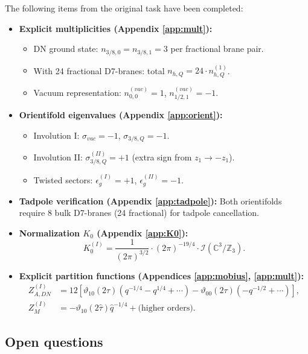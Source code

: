 \documentclass[11pt]{article}
\newcommand{\Z}{\mathbb{Z}}
\newcommand{\C}{\mathbb{C}}
\newcommand{\vt}{\vartheta}
\newcommand{\hq}{\hat{q}}
\newcommand{\htau}{\hat{\tau}}
\begin{document}
The following items from the original task have been completed:

\begin{itemize}
\item \textbf{Explicit multiplicities (Appendix \ref{app:mult}):}
\begin{itemize}
\item DN ground state: $n_{3/8, 0} = n_{3/8, 1} = 3$ per fractional brane pair.
\item With 24 fractional D7-branes: total $n_{h,Q} = 24 \cdot n^{(1)}_{h,Q}$.
\item Vacuum representation: $n^{(vac)}_{0,0} = 1$, $n^{(vac)}_{1/2,1} = -1$.
\end{itemize}

\item \textbf{Orientifold eigenvalues (Appendix \ref{app:orient}):}
\begin{itemize}
\item Involution I: $\sigma_{vac} = -1$, $\sigma_{3/8,Q} = -1$.
\item Involution II: $\sigma^{(II)}_{3/8,Q} = +1$ (extra sign from $z_1 \to -z_1$).
\item Twisted sectors: $\epsilon_g^{(I)} = +1$, $\epsilon_g^{(II)} = -1$.
\end{itemize}

\item \textbf{Tadpole verification (Appendix \ref{app:tadpole}):} Both orientifolds require 8 bulk D7-branes (24 fractional) for tadpole cancellation.

\item \textbf{Normalization $K_0$ (Appendix \ref{app:K0}):}
\begin{equation}
K_0^{(I)} = \frac{1}{(2\pi)^{3/2}} \cdot (2\pi)^{-19/4} \cdot \mathcal{I}(\C^3/\Z_3).
\end{equation}

\item \textbf{Explicit partition functions (Appendices \ref{app:mobius}, \ref{app:mult}):}
\begin{align}
Z_{A,DN}^{(I)} &= 12 \left[ \vt_{10}(2\tau) \left( q^{-1/4} - q^{1/4} + \cdots \right) - \vt_{00}(2\tau) \left( -q^{-1/2} + \cdots \right) \right], \\
Z_M^{(I)} &= -\vt_{10}(2\htau) \hq^{-1/4} + \text{(higher orders)}.
\end{align}
\end{itemize}

\subsection{Open questions}
\end{document}
